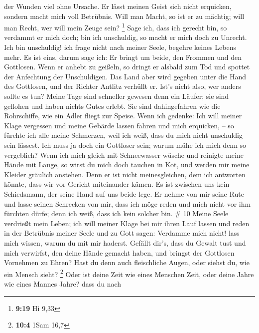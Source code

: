 der Wunden viel ohne Ursache.  Er lässt meinen Geist sich
nicht erquicken, sondern macht mich voll Betrübnis.  Will
man Macht, so ist er zu mächtig; will man Recht, wer will mein Zeuge
sein? \footnote{\textbf{9:19} Hi 9,33}  Sage ich, dass
ich gerecht bin, so verdammt er mich doch; bin ich unschuldig, so macht
er mich doch zu Unrecht.  Ich bin unschuldig! ich frage
nicht nach meiner Seele, begehre keines Lebens mehr.  Es
ist eins, darum sage ich: Er bringt um beide, den Frommen und den
Gottlosen.  Wenn er anhebt zu geißeln, so dringt er
alsbald zum Tod und spottet der Anfechtung der Unschuldigen.
 Das Land aber wird gegeben unter die Hand des Gottlosen,
und der Richter Antlitz verhüllt er. Ist's nicht also, wer anders sollte
es tun?  Meine Tage sind schneller gewesen denn ein
Läufer; sie sind geflohen und haben nichts Gutes erlebt. 
Sie sind dahingefahren wie die Rohrschiffe, wie ein Adler fliegt zur
Speise.  Wenn ich gedenke: Ich will meiner Klage
vergessen und meine Gebärde lassen fahren und mich erquicken, --
 so fürchte ich alle meine Schmerzen, weil ich weiß, dass
du mich nicht unschuldig sein lässest.  Ich muss ja doch
ein Gottloser sein; warum mühe ich mich denn so vergeblich?
 Wenn ich mich gleich mit Schneewasser wüsche und
reinigte meine Hände mit Lauge,  so wirst du mich doch
tauchen in Kot, und werden mir meine Kleider gräulich anstehen.
 Denn er ist nicht meinesgleichen, dem ich antworten
könnte, dass wir vor Gericht miteinander kämen.  Es ist
zwischen uns kein Schiedsmann, der seine Hand auf uns beide lege.
 Er nehme von mir seine Rute und lasse seinen Schrecken
von mir,  dass ich möge reden und mich nicht vor ihm
fürchten dürfe; denn ich weiß, dass ich kein solcher bin. \# 10
 Meine Seele verdrießt mein Leben; ich will meiner Klage
bei mir ihren Lauf lassen und reden in der Betrübnis meiner Seele
 und zu Gott sagen: Verdamme mich nicht! lass mich wissen,
warum du mit mir haderst.  Gefällt dir's, dass du Gewalt
tust und mich verwirfst, den deine Hände gemacht haben, und bringst der
Gottlosen Vornehmen zu Ehren?  Hast du denn auch
fleischliche Augen, oder siehst du, wie ein Mensch sieht? \footnote{\textbf{10:4}
  1Sam 16,7}  Oder ist deine Zeit wie eines Menschen Zeit,
oder deine Jahre wie eines Mannes Jahre?  dass du nach
